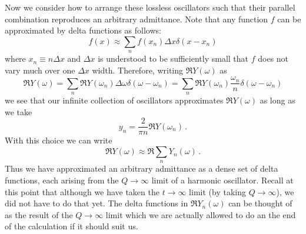 Now we consider how to arrange these lossless oscillators such that their parallel combination reproduces an arbitrary admittance.
Note that any function $f$ can be approximated by delta functions as follows:
\begin{equation}
f(x) \approx \sum_n f(x_n) \Delta x \delta(x - x_n)
\end{equation}
where $x_n \equiv n \Delta x$ and $\Delta x$ is understood to be sufficiently small that $f$ does not vary much over one $\Delta x$ width.
Therefore, writing $\Re Y(\omega)$ as
\begin{equation}
\Re Y(\omega)
= \sum_n \Re Y(\omega_n) \Delta \omega \delta(\omega - \omega_n)
= \sum_n \Re Y(\omega_n) \frac{\omega_n}{n} \delta(\omega - \omega_n)
\end{equation}
we see that our infinite collection of oscillators approximates $\Re Y(\omega)$ as long as we take
\begin{equation}
y_n = \frac{2}{\pi n} \Re Y(\omega_n) \, .
\end{equation}
With this choice we can write
\begin{equation}
\Re Y(\omega) \approx \Re \sum_n Y_n(\omega) \, .
\end{equation}
Thus we have approximated an arbitrary admittance as a dense set of delta functions, each arising from the $Q \rightarrow \infty$ limit of a harmonic oscillator.
Recall at this point that although we have taken the $t \rightarrow \infty$ limit (by taking $Q \rightarrow \infty$), we did not have to do that yet.
The delta functions in $\Re Y_n(\omega)$ can be thought of as the result of the $Q \rightarrow \infty$ limit which we are actually allowed to do an the end of the calculation if it should suit us.
